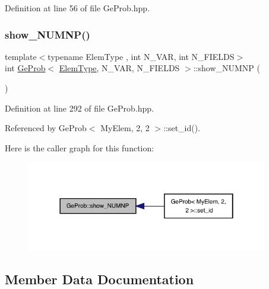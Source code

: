 Definition at line 56 of file Ge\+Prob.\+hpp.

\mbox{\label{classGeProb_a9470702789ccb98b8c952d3259bcba7f}} 
\subsubsection{\texorpdfstring{show\+\_\+\+N\+U\+M\+N\+P()}{show\_NUMNP()}}
{\footnotesize\ttfamily template$<$typename Elem\+Type , int N\+\_\+\+V\+AR, int N\+\_\+\+F\+I\+E\+L\+DS$>$ \\
int \hyperlink{classGeProb}{Ge\+Prob}$<$ \hyperlink{spectral_8h_aaa2c1a7b2d1b12c590d730fe6ac839fa}{Elem\+Type}, N\+\_\+\+V\+AR, N\+\_\+\+F\+I\+E\+L\+DS $>$\+::show\+\_\+\+N\+U\+M\+NP (\begin{DoxyParamCaption}{ }\end{DoxyParamCaption})}



Definition at line 292 of file Ge\+Prob.\+hpp.



Referenced by Ge\+Prob$<$ My\+Elem, 2, 2 $>$\+::set\+\_\+id().

Here is the caller graph for this function\+:
\nopagebreak
\begin{figure}[H]
\begin{center}
\leavevmode
\includegraphics[width=298pt]{classGeProb_a9470702789ccb98b8c952d3259bcba7f_icgraph}
\end{center}
\end{figure}


\subsection{Member Data Documentation}
\mbox{\label{classGeProb_a000f412eadf9ce5cf4f5391012283330}} 
